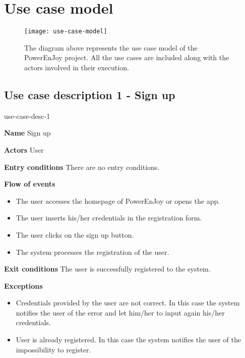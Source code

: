 \section{Use case model}

\begin{figure}[H]
	\centering
	\texttt{[image: use-case-model]}
	\caption[Use case model]{The diagram above represents the use case model of the PowerEnJoy project. All the use cases are included along with the actors involved in their execution.}
	\label{fig:use-case-model}
\end{figure}

\subsection{Use case description 1 - Sign up}
\begin{labeling}{use-case-desc-1}
		\item[\textbf{Name}] Sign up
		\item[\textbf{Actors}] User
		\item[\textbf{Entry conditions}] There are no entry conditions.
		\item[\textbf{Flow of events}]
			\begin{itemize}
				\item[]
				\item The user accesses the homepage of PowerEnJoy or opens the app.
				\item The user inserts his/her credentials in the registration form.
				\item The user clicks on the sign up button.
				\item The system processes the registration of the user.
			\end{itemize}
		\item[\textbf{Exit conditions}] The user is successfully registered to the system.
		\item[\textbf{Exceptions}]
			\begin{itemize}
				\item[]
				\item Credentials provided by the user are not correct. In this case the system notifies the user of the error and let him/her to input again his/her credentials. 
				\item User is already registered. In this case the system notifies the user of the impossibility to register.
			\end{itemize}
	\end{labeling}

